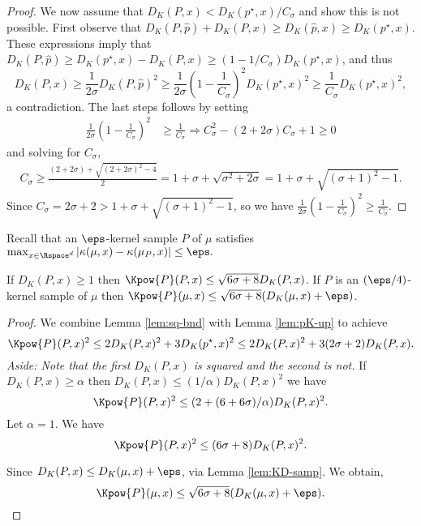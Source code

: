 \documentclass[11pt]{myclass}
\begin{document}
\begin{proof}
We now assume that $D_K(P,x) < D_K(p^\star,x)/C_\sigma$ and show this is not possible.  
First observe that $D_K(P, \hat p) + D_K(P, x) \geq D_K(\hat p, x) \geq D_K(p^\star, x)$.  
These expressions imply that $D_K(P,\hat p) \geq D_K(p^\star,x) - D_K(P,x) \geq (1-1/C_\sigma)D_K(p^\star, x)$, and thus 
\[
D_K(P,x) 
\geq 
\frac{1}{2 \sigma} D_K(P,\hat p)^2 
\geq 
\frac{1}{2 \sigma} \left(1-\frac{1}{C_\sigma}\right)^2 D_K(p^\star,x)^2
\geq 
\frac{1}{C_\sigma}D_K(p^\star,x)^2,
\]
a contradiction.  
The last steps follows by setting 
\begin{align*}
\frac{1}{2 \sigma} \left(1-\frac{1}{C_\sigma}\right)^2 & \geq \frac{1}{C_\sigma}
\Rightarrow
C_\sigma^2 - (2+2\sigma) C_\sigma + 1  \geq 0
\end{align*}
and solving for $C_\sigma$, 
\begin{align*}
C_\sigma 
 \geq 
\frac{(2+2 \sigma) + \sqrt{(2+2 \sigma)^2 - 4}}{2}
= 
1+ \sigma + \sqrt{\sigma^2 + 2 \sigma}
= 
1 +  \sigma + \sqrt{( \sigma +1)^2 - 1}.
\end{align*}
Since $C_\sigma =  2\sigma + 2 > 1 +  \sigma + \sqrt{( \sigma +1)^2 - 1}$, so we have $\frac{1}{2 \sigma} \left(1-\frac{1}{C_\sigma}\right)^2  \geq \frac{1}{C_\sigma}$.  
\end{proof}


Recall that an $\eps$-kernel sample $P$ of $\mu$ satisfies
$\max_{x \in \Rspace^d} |\kappa(\mu,x) - \kappa(\mu_P,x) | \leq \eps.$


\begin{theorem}
\label{thm:powK-up-eh}
If $D_K(P,x) \geq 1$ then $\Kpow{P}(P,x) \leq \sqrt{6 \sigma + 8} D_K(P,x)$. 
If $P$ is an $(\eps/4)$-kernel sample of $\mu$ then 
$\Kpow{P}(\mu,x) \leq \sqrt{6 \sigma+8} (D_K(\mu,x) +\eps)$.  
\end{theorem}
\begin{proof}
We combine Lemma \ref{lem:sq-bnd} with Lemma \ref{lem:pK-up} to achieve
\[
\Kpow{P}(P,x)^2 
\leq 
2 D_K(P,x)^2 + 3 D_K(p^\star,x)^2
\leq
2 D_K(P,x)^2 + 3(2\sigma+2)  D_K(P,x).
\]
\emph{Aside:  Note that the first $D_K(P,x)$ is squared and the second is not.}
If $D_K(P,x) \geq \alpha$ then $D_K(P,x) \leq (1/\alpha) D_K(P, x)^2$ we have
\[
\Kpow{P}(P,x)^2 \leq (2 + (6 + 6 \sigma)/\alpha) D_K(P,x)^2. 
\]
Let $\alpha=1$.  We have 
\[
\Kpow{P}(P,x)^2 \leq (6 \sigma + 8) D_K(P,x)^2. 
\]

Since $D_K(P,x) \leq D_K(\mu,x)+\eps$, via Lemma \ref{lem:KD-samp}. 
We obtain, 
\[
\Kpow{P}(\mu,x) \leq \sqrt{6 \sigma+8} (D_K(\mu,x) +\eps). \qedhere
\]
\end{proof}
\end{document}
